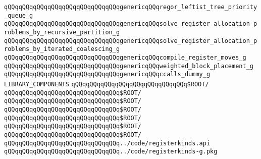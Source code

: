 \verb|qQQqqQQqqQQqqQQqqQQqqQQqqQQqqQQqgenericqQQqregor_leftist_tree_priority_queue_g|\newline
\verb|qQQqqQQqqQQqqQQqqQQqqQQqqQQqqQQqgenericqQQqsolve_register_allocation_problems_by_recursive_partition_g|\newline
\verb|qQQqqQQqqQQqqQQqqQQqqQQqqQQqqQQqgenericqQQqsolve_register_allocation_problems_by_iterated_coalescing_g|\newline
\verb|qQQqqQQqqQQqqQQqqQQqqQQqqQQqqQQqgenericqQQqcompile_register_moves_g|\newline
\verb|qQQqqQQqqQQqqQQqqQQqqQQqqQQqqQQqgenericqQQqweighted_block_placement_g|\newline
\verb|qQQqqQQqqQQqqQQqqQQqqQQqqQQqqQQqgenericqQQqccalls_dummy_g|\newline
\newline
\newline
\newline
\verb|LIBRARY_COMPONENTS|\newline
\newline
\verb|qQQqqQQqqQQqqQQqqQQqqQQqqQQqqQQq$ROOT/|\newline
\newline
\verb|qQQqqQQqqQQqqQQqqQQqqQQqqQQqqQQq$ROOT/|\newline
\verb|qQQqqQQqqQQqqQQqqQQqqQQqqQQqqQQq$ROOT/|\newline
\verb|qQQqqQQqqQQqqQQqqQQqqQQqqQQqqQQq$ROOT/|\newline
\verb|qQQqqQQqqQQqqQQqqQQqqQQqqQQqqQQq$ROOT/|\newline
\verb|qQQqqQQqqQQqqQQqqQQqqQQqqQQqqQQq$ROOT/|\newline
\verb|qQQqqQQqqQQqqQQqqQQqqQQqqQQqqQQq$ROOT/|\newline
\newline
\verb|qQQqqQQqqQQqqQQqqQQqqQQqqQQqqQQq../code/registerkinds.api|\newline
\verb|qQQqqQQqqQQqqQQqqQQqqQQqqQQqqQQq../code/registerkinds-g.pkg|\newline
